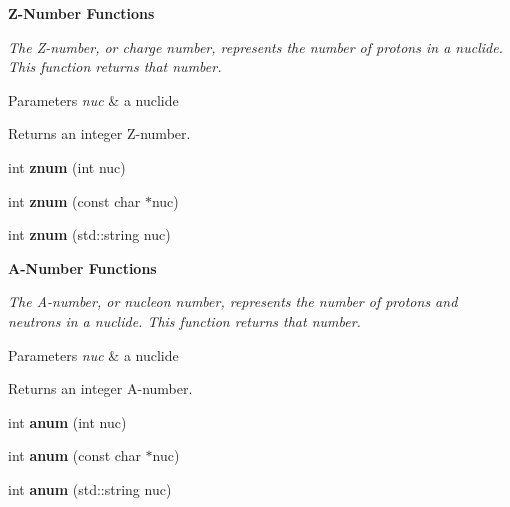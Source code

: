 \begin{Indent}{\bf Z-\/\+Number Functions}\par
{\em The Z-\/number, or charge number, represents the number of protons in a nuclide. This function returns that number. 
\begin{DoxyParams}{Parameters}
{\em nuc} & a nuclide \\
\hline
\end{DoxyParams}
\begin{DoxyReturn}{Returns}
an integer Z-\/number. 
\end{DoxyReturn}
}\begin{DoxyCompactItemize}
\item 
int {\bfseries znum} (int nuc)\hypertarget{namespacepyne_1_1nucname_a2c04523f8462b5904458efa27433d159}{}\label{namespacepyne_1_1nucname_a2c04523f8462b5904458efa27433d159}

\item 
int {\bfseries znum} (const char $\ast$nuc)\hypertarget{namespacepyne_1_1nucname_a3447b849d0cb1cc8f6f51caaf2e441ee}{}\label{namespacepyne_1_1nucname_a3447b849d0cb1cc8f6f51caaf2e441ee}

\item 
int {\bfseries znum} (std\+::string nuc)\hypertarget{namespacepyne_1_1nucname_a2af22abe099e287b32b869262eef1b21}{}\label{namespacepyne_1_1nucname_a2af22abe099e287b32b869262eef1b21}

\end{DoxyCompactItemize}
\end{Indent}
\begin{Indent}{\bf A-\/\+Number Functions}\par
{\em The A-\/number, or nucleon number, represents the number of protons and neutrons in a nuclide. This function returns that number. 
\begin{DoxyParams}{Parameters}
{\em nuc} & a nuclide \\
\hline
\end{DoxyParams}
\begin{DoxyReturn}{Returns}
an integer A-\/number. 
\end{DoxyReturn}
}\begin{DoxyCompactItemize}
\item 
int {\bfseries anum} (int nuc)\hypertarget{namespacepyne_1_1nucname_a64059037d5c5928c3f736754b8f20f10}{}\label{namespacepyne_1_1nucname_a64059037d5c5928c3f736754b8f20f10}

\item 
int {\bfseries anum} (const char $\ast$nuc)\hypertarget{namespacepyne_1_1nucname_a175e7d94fc64b7b8ec745aa5d8d3502a}{}\label{namespacepyne_1_1nucname_a175e7d94fc64b7b8ec745aa5d8d3502a}

\item 
int {\bfseries anum} (std\+::string nuc)\hypertarget{namespacepyne_1_1nucname_ac1fa1ad42620cc2f337f8b836508185e}{}\label{namespacepyne_1_1nucname_ac1fa1ad42620cc2f337f8b836508185e}

\end{DoxyCompactItemize}
\end{Indent}
